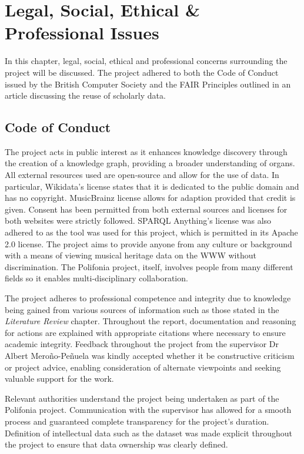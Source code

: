\chapter{Legal, Social, Ethical \& Professional Issues} 
In this chapter, legal, social, ethical and professional concerns surrounding the project will be discussed. The project adhered to both the Code of Conduct issued by the British Computer Society \cite{bcs} and the FAIR Principles \cite{fairprinciples} outlined in an article discussing the reuse of scholarly data.
                                                      
\section{Code of Conduct}
\hspace{0.5cm} The project acts in public interest as it enhances knowledge discovery through the creation of a knowledge graph, providing a broader understanding of organs. All external resources used are open-source and allow for the use of data. In particular, Wikidata's license \cite{wikidatalicense} states that it is dedicated to the public domain and has no copyright. MusicBrainz license \cite{musicbrainzlicense} allows for adaption provided that credit is given. Consent has been permitted from both external sources and licenses for both websites were strictly followed. SPARQL Anything's license \cite{apachelicense} was also adhered to as the tool was used for this project, which is permitted in its Apache 2.0 license. The project aims to provide anyone from any culture or background with a means of viewing musical heritage data on the WWW without discrimination. The Polifonia project, itself, involves people from many different fields so it enables multi-disciplinary collaboration. 

The project adheres to professional competence and integrity due to knowledge being gained from various sources of information such as those stated in the \textit{Literature Review} chapter. Throughout the report, documentation and reasoning for actions are explained with appropriate citations where necessary to ensure academic integrity. Feedback throughout the project from the supervisor Dr Albert Mero{\~n}o-Pe{\~n}uela was kindly accepted whether it be constructive criticism or project advice, enabling consideration of alternate viewpoints and seeking valuable support for the work.

Relevant authorities understand the project being undertaken as part of the Polifonia project. Communication with the supervisor has allowed for a smooth process and guaranteed complete transparency for the project's duration. Definition of intellectual data such as the dataset was made explicit throughout the project to ensure that data ownership was clearly defined.

